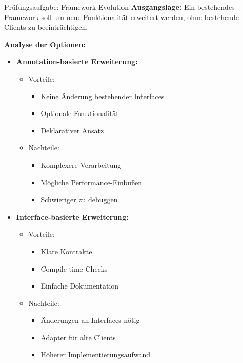\begin{example2}{Prüfungsaufgabe: Framework Evolution}
\textbf{Ausgangslage:}
Ein bestehendes Framework soll um neue Funktionalität erweitert werden, ohne bestehende 
Clients zu beeinträchtigen.

\textbf{Analyse der Optionen:}
\begin{itemize}
    \item \textbf{Annotation-basierte Erweiterung:}
    \begin{itemize}
        \item Vorteile:
        \begin{itemize}
            \item Keine Änderung bestehender Interfaces
            \item Optionale Funktionalität
            \item Deklarativer Ansatz
        \end{itemize}
        \item Nachteile:
        \begin{itemize}
            \item Komplexere Verarbeitung
            \item Mögliche Performance-Einbußen
            \item Schwieriger zu debuggen
        \end{itemize}
    \end{itemize}
    
    \item \textbf{Interface-basierte Erweiterung:}
    \begin{itemize}
        \item Vorteile:
        \begin{itemize}
            \item Klare Kontrakte
            \item Compile-time Checks
            \item Einfache Dokumentation
        \end{itemize}
        \item Nachteile:
        \begin{itemize}
            \item Änderungen an Interfaces nötig
            \item Adapter für alte Clients
            \item Höherer Implementierungsaufwand
        \end{itemize}
    \end{itemize}
\end{itemize}
\end{example2}

